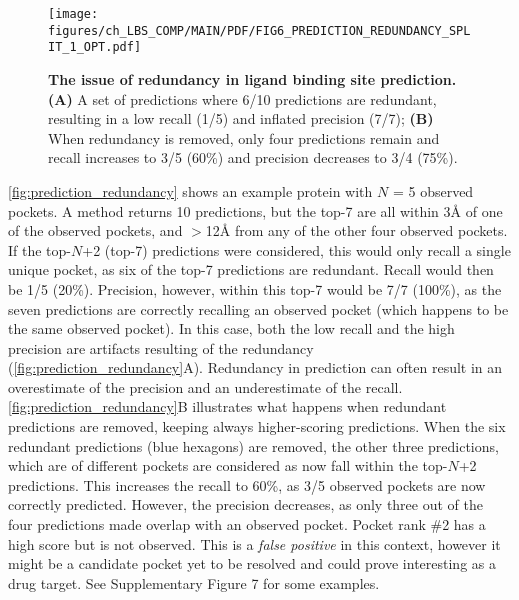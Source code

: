 \begin{figure}[htb!]
    \centering
    \texttt{[image: figures/ch\_LBS\_COMP/MAIN/PDF/FIG6\_PREDICTION\_REDUNDANCY\_SPLIT\_1\_OPT.pdf]}
    \caption[The issue of redundancy in ligand binding site prediction]{\textbf{The issue of redundancy in ligand binding site prediction.} \textbf{(A)} A set of predictions where 6/10 predictions are redundant, resulting in a low recall (1/5) and inflated precision (7/7); \textbf{(B)} When redundancy is removed, only four predictions remain and recall increases to 3/5 (60\%) and precision decreases to 3/4 (75\%).}
    \label{fig:prediction_redundancy}
\end{figure}

\FloatBarrier

\autoref{fig:prediction_redundancy} shows an example protein with $N$ = 5 observed pockets. A method returns 10 predictions, but the top-7 are all within 3\AA{} of one of the observed pockets, and $>$12\AA{} from any of the other four observed pockets. If the top-$N$+2 (top-7) predictions were considered, this would only recall a single unique pocket, as six of the top-7 predictions are redundant. Recall would then be 1/5 (20\%). Precision, however, within this top-7 would be 7/7 (100\%), as the seven predictions are correctly recalling an observed pocket (which happens to be the same observed pocket). In this case, both the low recall and the high precision are artifacts resulting of the redundancy (\autoref{fig:prediction_redundancy}A). Redundancy in prediction can often result in an overestimate of the precision and an underestimate of the recall. \autoref{fig:prediction_redundancy}B illustrates what happens when redundant predictions are removed, keeping always higher-scoring predictions. When the six redundant predictions (blue hexagons) are removed, the other three predictions, which are of different pockets are considered as now fall within the top-$N$+2 predictions. This increases the recall to 60\%, as 3/5 observed pockets are now correctly predicted. However, the precision decreases, as only three out of the four predictions made overlap with an observed pocket. Pocket rank \#2 has a high score but is not observed. This is a \textit{false positive} in this context, however it might be a candidate pocket yet to be resolved and could prove interesting as a drug target. See Supplementary Figure 7 for some examples.

